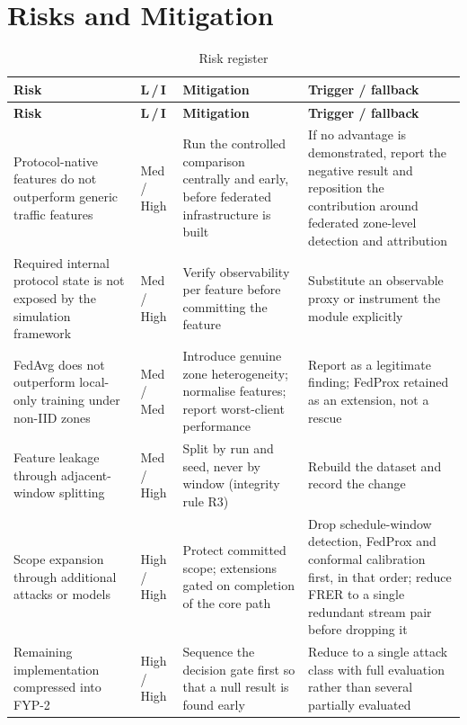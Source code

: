 \section{Risks and Mitigation}

\begin{longtable}{p{} p{} p{} p{}}
\caption{Risk register}\\
\toprule
\textbf{Risk} & \textbf{L\,/\,I} & \textbf{Mitigation} & \textbf{Trigger / fallback} \\
\midrule
\endfirsthead
\toprule
\textbf{Risk} & \textbf{L\,/\,I} & \textbf{Mitigation} & \textbf{Trigger / fallback} \\
\midrule
\endhead
Protocol-native features do not outperform generic traffic features &
Med / High &
Run the controlled comparison centrally and early, before federated infrastructure is
built &
If no advantage is demonstrated, report the negative result and reposition the
contribution around federated zone-level detection and attribution \\
\addlinespace
Required internal protocol state is not exposed by the simulation framework &
Med / High &
Verify observability per feature before committing the feature &
Substitute an observable proxy or instrument the module explicitly \\
\addlinespace
FedAvg does not outperform local-only training under non-IID zones &
Med / Med &
Introduce genuine zone heterogeneity; normalise features; report worst-client
performance &
Report as a legitimate finding; FedProx retained as an extension, not a rescue \\
\addlinespace
Feature leakage through adjacent-window splitting &
Med / High &
Split by run and seed, never by window (integrity rule R3) &
Rebuild the dataset and record the change \\
\addlinespace
Scope expansion through additional attacks or models &
High / High &
Protect committed scope; extensions gated on completion of the core path &
Drop schedule-window detection, FedProx and conformal calibration first, in that
order; reduce FRER to a single redundant stream pair before dropping it \\
\addlinespace
Remaining implementation compressed into FYP-2 &
High / High &
Sequence the decision gate first so that a null result is found early &
Reduce to a single attack class with full evaluation rather than several partially
evaluated \\
\bottomrule
\end{longtable}

